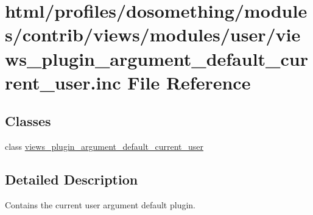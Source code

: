 \hypertarget{views__plugin__argument__default__current__user_8inc}{
\section{html/profiles/dosomething/modules/contrib/views/modules/user/views\_\-plugin\_\-argument\_\-default\_\-current\_\-user.inc File Reference}
\label{views__plugin__argument__default__current__user_8inc}
}
\subsection*{Classes}
\begin{DoxyCompactItemize}
\item 
class \hyperlink{classviews__plugin__argument__default__current__user}{views\_\-plugin\_\-argument\_\-default\_\-current\_\-user}
\end{DoxyCompactItemize}


\subsection{Detailed Description}
Contains the current user argument default plugin. 